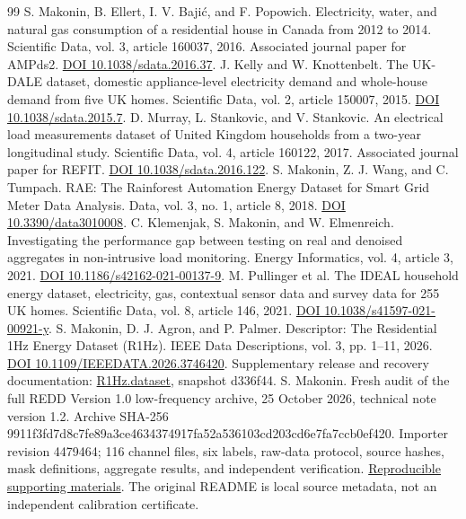\documentclass[11pt,letterpaper]{article}
\begin{document}
\begin{thebibliography}{99}
 S. Makonin, B. Ellert, I. V. Bajić, and F. Popowich. Electricity, water, and natural gas consumption of a residential house in Canada from 2012 to 2014. Scientific Data, vol. 3, article 160037, 2016. Associated journal paper for AMPds2. \href{https://doi.org/10.1038/sdata.2016.37}{DOI 10.1038/sdata.2016.37}.
 J. Kelly and W. Knottenbelt. The UK-DALE dataset, domestic appliance-level electricity demand and whole-house demand from five UK homes. Scientific Data, vol. 2, article 150007, 2015. \href{https://doi.org/10.1038/sdata.2015.7}{DOI 10.1038/sdata.2015.7}.
 D. Murray, L. Stankovic, and V. Stankovic. An electrical load measurements dataset of United Kingdom households from a two-year longitudinal study. Scientific Data, vol. 4, article 160122, 2017. Associated journal paper for REFIT. \href{https://doi.org/10.1038/sdata.2016.122}{DOI 10.1038/sdata.2016.122}.
 S. Makonin, Z. J. Wang, and C. Tumpach. RAE: The Rainforest Automation Energy Dataset for Smart Grid Meter Data Analysis. Data, vol. 3, no. 1, article 8, 2018. \href{https://doi.org/10.3390/data3010008}{DOI 10.3390/data3010008}.
 C. Klemenjak, S. Makonin, and W. Elmenreich. Investigating the performance gap between testing on real and denoised aggregates in non-intrusive load monitoring. Energy Informatics, vol. 4, article 3, 2021. \href{https://doi.org/10.1186/s42162-021-00137-9}{DOI 10.1186/s42162-021-00137-9}.
 M. Pullinger et al. The IDEAL household energy dataset, electricity, gas, contextual sensor data and survey data for 255 UK homes. Scientific Data, vol. 8, article 146, 2021. \href{https://doi.org/10.1038/s41597-021-00921-y}{DOI 10.1038/s41597-021-00921-y}.
 S. Makonin, D. J. Agron, and P. Palmer. Descriptor: The Residential 1Hz Energy Dataset (R1Hz). IEEE Data Descriptions, vol. 3, pp. 1--11, 2026. \href{https://doi.org/10.1109/IEEEDATA.2026.3746420}{DOI 10.1109/IEEEDATA.2026.3746420}. Supplementary release and recovery documentation: \href{https://github.com/smakonin/R1Hz.dataset/blob/d336f44bc969235951d086ad4e787a42bdec21bd/README.md}{R1Hz.dataset}, snapshot d336f44.
 S. Makonin. Fresh audit of the full REDD Version 1.0 low-frequency archive, 25 October 2026, technical note version 1.2. Archive SHA-256 9911f3fd7d8c7fe89a3ce4634374917fa52a536103cd203cd6e7fa7ccb0ef420. Importer revision 4479464; 116 channel files, six labels, raw-data protocol, source hashes, mask definitions, aggregate results, and independent verification. \href{https://github.com/smakonin/DataWrangle_REDD/tree/codex/redd-full-archive-results/docs/source/whitepaper}{Reproducible supporting materials}. The original README is local source metadata, not an independent calibration certificate.
\end{thebibliography}
\endgroup
\end{document}

